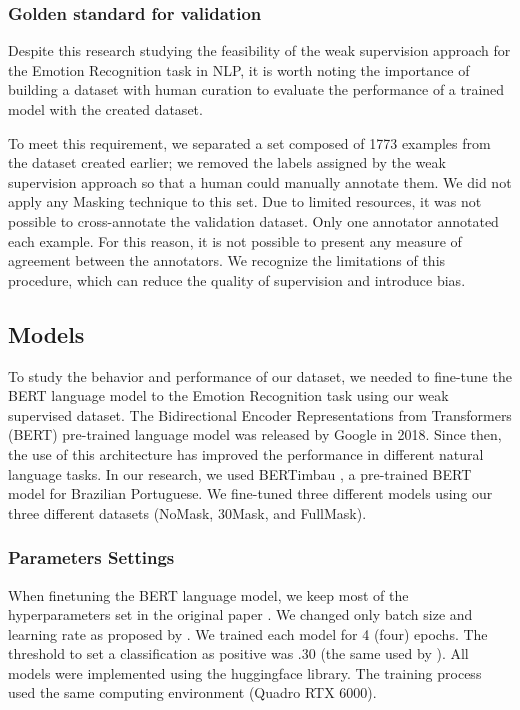 \documentclass[12pt]{article}
\begin{document}
\subsubsection{Golden standard for validation}
Despite this research studying the feasibility of the weak supervision approach for the Emotion Recognition task in NLP, it is worth noting the importance of building a dataset with human curation to evaluate the performance of a trained model with the created dataset.

To meet this requirement, we separated a set composed of 1773 examples from the dataset created earlier; we removed the labels assigned by the weak supervision approach so that a human could manually annotate them. We did not apply any Masking technique to this set. Due to limited resources, it was not possible to cross-annotate the validation dataset. Only one annotator annotated each example. For this reason, it is not possible to present any measure of agreement between the annotators. We recognize the limitations of this procedure, which can reduce the quality of supervision and introduce bias. 


\subsection{Models}

To study the behavior and performance of our dataset, we needed to fine-tune the BERT language model to the Emotion Recognition task using our weak supervised dataset. The Bidirectional Encoder Representations from Transformers (BERT) pre-trained language model \cite{Devlin2018} was released by Google in 2018. Since then, the use of this architecture has improved the performance in different natural language tasks. In our research, we used BERTimbau \cite{Bertimbau}, a pre-trained BERT model for Brazilian Portuguese. We fine-tuned three different models using our three different datasets (NoMask, 30Mask, and FullMask).


\subsubsection{Parameters Settings}
When finetuning the BERT language model, we keep most of the hyperparameters set in the original paper \cite{Devlin2018}. We changed only batch size and learning rate as proposed by \cite{Demszky2020}. We trained each model for 4 (four) epochs. The threshold to set a classification as positive was .30 (the same used by \cite{Demszky2020}). All models were implemented using the huggingface library. The training process used the same computing environment (Quadro RTX 6000).
\end{document}
